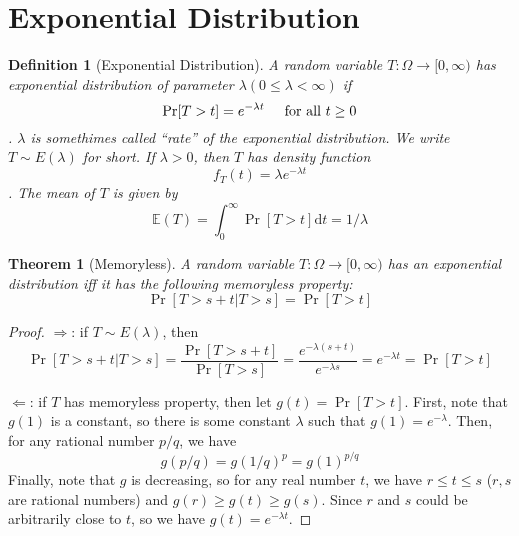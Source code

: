 \documentclass{article}
\newtheorem{define}{Definition}[section]
\newtheorem{theorem}{Theorem}[section]
\begin{document}
\section{Exponential Distribution}
\begin{define}[Exponential Distribution] \label{def:exp-distri}
  A random variable $T: \Omega \to [0, \infty)$ has exponential distribution of parameter $\lambda (0 \leq \lambda < \infty)$ if
  \[\Pr[T > t] = e^{-\lambda t} \hspace{0.5cm} \mbox{for all $t \geq 0$}\].
  $\lambda$ is somethimes called ``rate'' of the exponential distribution.
  We write $T \sim E(\lambda)$ for short.
  If $\lambda > 0$, then $T$ has density function
  \[f_{T}(t) = \lambda e^{-\lambda t}\].
  The mean of $T$ is given by
  \[\mathbb{E}(T) = \int_{0}^\infty \Pr[T > t] \mathrm{d} t = 1/\lambda\]
\end{define}
\begin{theorem}[Memoryless]
  A random variable $T: \Omega \to [0, \infty)$ has an exponential distribution iff it has the following memoryless property:
  \[\Pr[T > s + t | T > s] = \Pr[T > t]\]
\end{theorem}
\begin{proof}
  $\Rightarrow$: if $T\sim E(\lambda)$, then
  \[\Pr[T > s + t | T > s] = \frac{\Pr[T > s + t]}{\Pr[T > s]} = \frac{e^{-\lambda(s + t)}}{e^{-\lambda s}} = e^{-\lambda t} = \Pr[T > t]\]

  $\Leftarrow$: if $T$ has memoryless property, then let $g(t) = \Pr[T > t]$.
  First, note that $g(1)$ is a constant, so there is some constant $\lambda$ such that $g(1) = e^{-\lambda}$.
  Then, for any rational number $p/q$, we have
  \[g(p/q) = g(1/q)^p = g(1)^{p/q}\]
  Finally, note that $g$ is decreasing, so for any real number $t$, we have $r \leq t \leq s$ ($r, s$ are rational numbers) and $g(r) \geq g(t) \geq g(s)$. Since $r$ and $s$ could be arbitrarily close to $t$, so we have $g(t) = e^{-\lambda t}$.
\end{proof}
\end{document}

